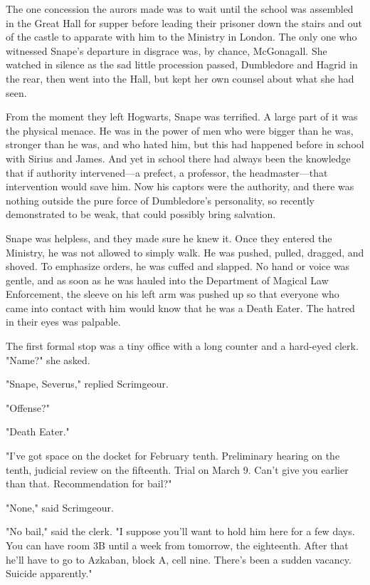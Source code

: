 The one concession the aurors made was to wait until the school was assembled in the Great Hall for supper before leading their prisoner down the stairs and out of the castle to apparate with him to the Ministry in London. The only one who witnessed Snape's departure in disgrace was, by chance, McGonagall. She watched in silence as the sad little procession passed, Dumbledore and Hagrid in the rear, then went into the Hall, but kept her own counsel about what she had seen.

From the moment they left Hogwarts, Snape was terrified. A large part of it was the physical menace. He was in the power of men who were bigger than he was, stronger than he was, and who hated him, but this had happened before in school with Sirius and James. And yet in school there had always been the knowledge that if authority intervened—a prefect, a professor, the headmaster—that intervention would save him. Now his captors were the authority, and there was nothing outside the pure force of Dumbledore's personality, so recently demonstrated to be weak, that could possibly bring salvation.

Snape was helpless, and they made sure he knew it. Once they entered the Ministry, he was not allowed to simply walk. He was pushed, pulled, dragged, and shoved. To emphasize orders, he was cuffed and slapped. No hand or voice was gentle, and as soon as he was hauled into the Department of Magical Law Enforcement, the sleeve on his left arm was pushed up so that everyone who came into contact with him would know that he was a Death Eater. The hatred in their eyes was palpable.

The first formal stop was a tiny office with a long counter and a hard-eyed clerk. "Name?" she asked.

"Snape, Severus," replied Scrimgeour.

"Offense?"

"Death Eater."

"I've got space on the docket for February tenth. Preliminary hearing on the tenth, judicial review on the fifteenth. Trial on March 9. Can't give you earlier than that. Recommendation for bail?"

"None," said Scrimgeour.

"No bail," said the clerk. "I suppose you'll want to hold him here for a few days. You can have room 3B until a week from tomorrow, the eighteenth. After that he'll have to go to Azkaban, block A, cell nine. There's been a sudden vacancy. Suicide apparently."

